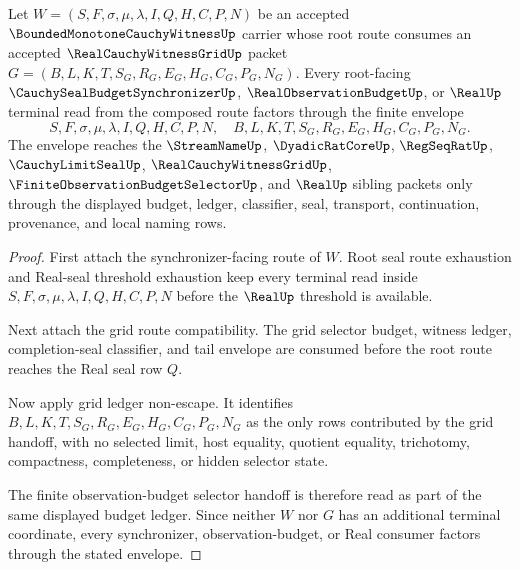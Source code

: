 \begin{theorem}
\label{thm:bounded-monotone-cauchy-witness-grid-synchronizer-terminal-envelope}
Let $W=(S,F,\sigma,\mu,\lambda,I,Q,H,C,P,N)$ be an accepted $\BoundedMonotoneCauchyWitnessUp$ carrier whose root route consumes an accepted $\RealCauchyWitnessGridUp$ packet $G=(B,L,K,T,S_G,R_G,E_G,H_G,C_G,P_G,N_G)$. Every root-facing $\CauchySealBudgetSynchronizerUp$, $\RealObservationBudgetUp$, or $\RealUp$ terminal read from the composed route factors through the finite envelope
$$
S,F,\sigma,\mu,\lambda,I,Q,H,C,P,N,\quad B,L,K,T,S_G,R_G,E_G,H_G,C_G,P_G,N_G.
$$
The envelope reaches the $\StreamNameUp$, $\DyadicRatCoreUp$, $\RegSeqRatUp$, $\CauchyLimitSealUp$, $\RealCauchyWitnessGridUp$, $\FiniteObservationBudgetSelectorUp$, and $\RealUp$ sibling packets only through the displayed budget, ledger, classifier, seal, transport, continuation, provenance, and local naming rows.
\end{theorem}
\begin{proof}
First attach the synchronizer-facing route of $W$. Root seal route exhaustion and Real-seal threshold exhaustion keep every terminal read inside $S,F,\sigma,\mu,\lambda,I,Q,H,C,P,N$ before the $\RealUp$ threshold is available.

Next attach the grid route compatibility. The grid selector budget, witness ledger, completion-seal classifier, and tail envelope are consumed before the root route reaches the Real seal row $Q$.

Now apply grid ledger non-escape. It identifies $B,L,K,T,S_G,R_G,E_G,H_G,C_G,P_G,N_G$ as the only rows contributed by the grid handoff, with no selected limit, host equality, quotient equality, trichotomy, compactness, completeness, or hidden selector state.

The finite observation-budget selector handoff is therefore read as part of the same displayed budget ledger. Since neither $W$ nor $G$ has an additional terminal coordinate, every synchronizer, observation-budget, or Real consumer factors through the stated envelope.
\end{proof}


